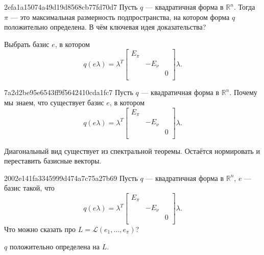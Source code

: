 \begin{note}{2efa1a15074a49d19d8568cb77fd70d7}
    Пусть \({ q }\) --- квадратичная форма в \({ \mathbb R^{n} }\).
    Тогда \({ \pi }\) --- это максимальная размерность подпространства, на котором форма \({ q }\) положительно определена.
    В чём ключевая идея доказательства?

    \begin{cloze}{1}
        Выбрать базис \({ e }\), в котором
        \[
            q(e\lambda) = \lambda^{T} \begin{bmatrix}
                E_{\pi}   \\
                & -E_{\nu} \\
                && 0      \\
            \end{bmatrix}
            \lambda.
        \]
    \end{cloze}
\end{note}

\begin{note}{7a2d2be95e6543ff9f5642410cda1fc7}
    Пусть \({ q }\) --- квадратичная форма в \({ \mathbb R^{n} }\).
    Почему мы знаем, что существует базис \({ e }\), в котором
    \[
        q(e\lambda) = \lambda^{T} \begin{bmatrix}
            E_{\pi}   \\
            & -E_{\nu} \\
            && 0      \\
        \end{bmatrix}
        \lambda.
    \]

    \begin{cloze}{1}
        Диагональный вид существует из спектральной теоремы. Остаётся нормировать и переставить базисные векторы.
    \end{cloze}
\end{note}

\begin{note}{2002e141fa3345999d474a7c75a27b69}
    Пусть \({ q }\) --- квадратичная форма в \({ \mathbb R^{n} }\),
    \({ e }\) --- базис такой, что
    \[
        q(e\lambda) = \lambda^{T} \begin{bmatrix}
            E_{\pi}   \\
            & -E_{\nu} \\
            && 0      \\
        \end{bmatrix}
        \lambda.
    \]
    Что можно сказать про \({ L = \mathscr L (e_1, \ldots, e_{\pi}) }\)?

    \begin{cloze}{1}
        \({ q }\) положительно определена на \({ L }\).
    \end{cloze}
\end{note}

